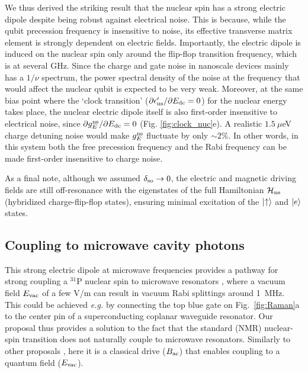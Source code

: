 \documentclass[
 aps,prb,twocolumn,
 amsmath,amssymb,superscriptaddress,
] {revtex4-1}
\begin{document}
We thus derived the striking result that the nuclear spin has a strong electric dipole despite being robust against electrical noise. This is because, while the qubit precession frequency is insensitive to noise, its effective transverse matrix element is strongly dependent on electric fields. Importantly, the electric dipole is induced on the nuclear spin  only around the flip-flop transition frequency, which is at several GHz. Since the charge and gate noise in nanoscale devices mainly has a $1/\nu$ spectrum, the power spectral density of the noise at the frequency that would affect the nuclear qubit is expected to be very weak. Moreover, at the same bias point where the `clock transition' ($\partial\epsilon'_{\rm ns}/\partial E_{\rm dc}=0$) for the nuclear energy takes place, the nuclear electric dipole itself is also first-order insensitive to electrical noise, since $\partial g_{E}^{\rm ns}/\partial E_{\rm dc}=0$ (Fig. \ref{fig:clock_nuc}e). A realistic $1.5~\mu$eV charge detuning noise \cite{Freeman2016} would make $g_{E}^{\rm ns}$ fluctuate by only $\sim2\%$. In other words, in this system both the free precession frequency and the Rabi frequency can be made first-order insensitive to charge noise.

As a final note, although we assumed $\delta_{\rm so} \rightarrow 0$, the electric and magnetic driving fields are still off-resonance with the eigenstates of the full Hamiltonian $\mathcal{H}_{\rm ns}$ (hybridized charge-flip-flop states), ensuring minimal excitation of the $\ket{\uparrow}$ and $\ket{e}$ states.

\subsection{Coupling to microwave cavity photons}

This strong electric dipole at microwave frequencies provides a pathway for strong coupling a $^{31}$P nuclear spin to microwave resonators \cite{Blais2004}, where a vacuum field $E_{\rm vac}$ of a few V/m can result in vacuum Rabi splittings around 1~MHz. This could be achieved \textit{e.g.} by connecting the top blue gate on Fig.~\ref{fig:Raman}a to the center pin of a superconducting coplanar waveguide resonator. Our proposal thus provides a solution to the fact that the standard (NMR) nuclear-spin transition does not naturally couple to microwave resonators. Similarly to other proposals  \cite{Pachos2002,Childress2004,Feng2008,Abanto2010}, here it is a classical drive ($B_{\rm ac}$) that enables coupling to a quantum field ($E_{\rm vac}$).
\end{document}
